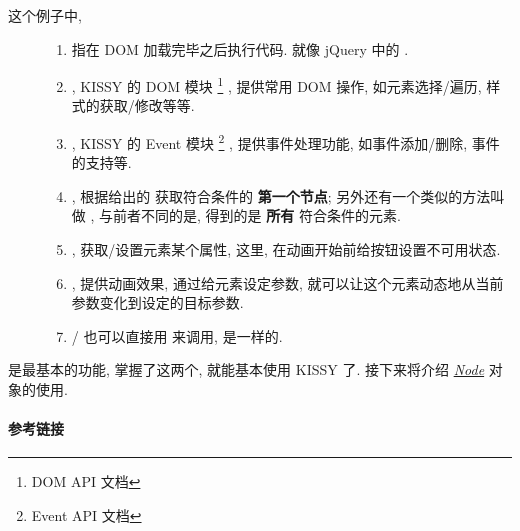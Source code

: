 \documentclass[letterpaper,10pt,english]{sphinxmanual}
\begin{document}
\begin{description}
\item[{这个例子中,}] \leavevmode\begin{enumerate}
\item {}
{\hyperref[api/seed/web/ready:Web.KISSY.ready]{}} 指在 DOM 加载完毕之后执行代码. 就像 jQuery 中的 .

\item {}
{\hyperref[api/core/dom/index:module-DOM]{}}, KISSY 的 DOM 模块 \footnote{
DOM API 文档
} , 提供常用 DOM 操作, 如元素选择/遍历, 样式的获取/修改等等.

\item {}
{\hyperref[api/core/event/index:module-Event]{}}, KISSY 的 Event 模块 \footnote{
Event API 文档
} , 提供事件处理功能, 如事件添加/删除,  事件的支持等.

\item {}
{\hyperref[api/core/dom/get:DOM.get]{}}, 根据给出的  获取符合条件的 \textbf{第一个节点}; 另外还有一个类似的方法叫做 {\hyperref[api/core/dom/query:DOM.query]{}} , 与前者不同的是, 得到的是 \textbf{所有} 符合条件的元素.

\item {}
{\hyperref[api/core/dom/attr:DOM.attr]{}}, 获取/设置元素某个属性, 这里, 在动画开始前给按钮设置不可用状态.

\item {}
{\hyperref[api/core/anim/index:module-Anim]{}}, 提供动画效果, 通过给元素设定参数, 就可以让这个元素动态地从当前参数变化到设定的目标参数.

\item {}
{\hyperref[api/core/dom/get:DOM.get]{}}/{\hyperref[api/core/dom/query:DOM.query]{}} 也可以直接用  来调用, 是一样的.

\end{enumerate}

\end{description}

 是最基本的功能, 掌握了这两个, 就能基本使用 KISSY 了.
接下来将介绍 {\hyperref[quickstart/node:quickstart-usenode]{\emph{Node}}} 对象的使用.
\paragraph{参考链接}
\end{document}
